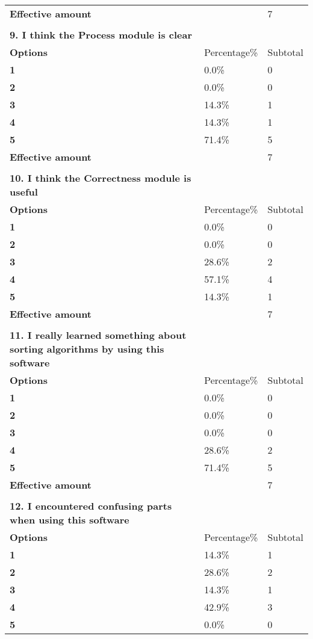 \documentclass[
]{article}
\begin{document}
\begin{longtable}[]{@{}lll@{}}
\textbf{Effective amount} & & 7 \\
& & \\
\textbf{9. I think the Process module is clear} & & \\
\textbf{Options} & Percentage\% & Subtotal \\
\textbf{1} & 0.0\% & 0 \\
\textbf{2} & 0.0\% & 0 \\
\textbf{3} & 14.3\% & 1 \\
\textbf{4} & 14.3\% & 1 \\
\textbf{5} & 71.4\% & 5 \\
\textbf{Effective amount} & & 7 \\
& & \\
\textbf{10. I think the Correctness module is useful} & & \\
\textbf{Options} & Percentage\% & Subtotal \\
\textbf{1} & 0.0\% & 0 \\
\textbf{2} & 0.0\% & 0 \\
\textbf{3} & 28.6\% & 2 \\
\textbf{4} & 57.1\% & 4 \\
\textbf{5} & 14.3\% & 1 \\
\textbf{Effective amount} & & 7 \\
& & \\
\textbf{11. I really learned something about sorting algorithms by using
this software } & & \\
\textbf{Options} & Percentage\% & Subtotal \\
\textbf{1} & 0.0\% & 0 \\
\textbf{2} & 0.0\% & 0 \\
\textbf{3} & 0.0\% & 0 \\
\textbf{4} & 28.6\% & 2 \\
\textbf{5} & 71.4\% & 5 \\
\textbf{Effective amount} & & 7 \\
& & \\
\textbf{12. I encountered confusing parts when using this software} &
& \\
\textbf{Options} & Percentage\% & Subtotal \\
\textbf{1} & 14.3\% & 1 \\
\textbf{2} & 28.6\% & 2 \\
\textbf{3} & 14.3\% & 1 \\
\textbf{4} & 42.9\% & 3 \\
\textbf{5} & 0.0\% & 0 \\

\end{longtable}
\end{document}
